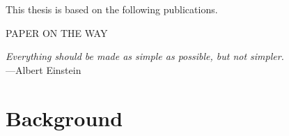 \documentclass{book}
\begin{document}


\label{sec:paperlist}

This thesis is based on the following publications.

\begin{description}[leftmargin=!,labelwidth=0.7cm]
  \item[\I] 
  \item[\II] 
  \item[\III] 
  \item[\IV] 
  \item[\V] 
  \item[\VI] PAPER ON THE WAY
\end{description}



\mainmatter
\setcounter{table}{0}
\setcounter{page}{1}

\begin{flushright}
  \textit{Everything should be made as simple as possible, but not simpler.}\\
  {---Albert Einstein}
\end{flushright}

\section{Background}
\end{document}
